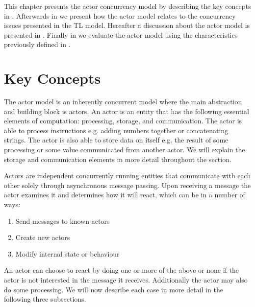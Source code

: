 \makeatletter {}\makeatother
{}
This chapter presents the actor concurrency model by describing the key concepts in . Afterwards in  we present how the actor model relates to the concurrency issues presented in the \ac{TL} model. Hereafter a discussion about the actor model is presented in . Finally in  we evaluate the actor model using the characteristics previously defined in .

\section{Key Concepts}\label{sec:actor_concepts}
The actor model is an inherently concurrent model where the main abstraction and building block is actors\cite[p. 2]{karmani2009actor}. An actor is an entity that has the following essential elements of computation\cite{actorLangNextVideo}: processing, storage, and communication. The actor is able to process instructions e.g. adding numbers together or concatenating strings. The actor is also able to store data on itself e.g. the result of some processing or some value communicated from another actor. We will explain the storage and communication elements in more detail throughout the section.

Actors are independent concurrently running entities that communicate with each other solely through asynchronous message passing\cite[p. 304]{tasharofi2013scala}. Upon receiving a message the actor examines it and determines how it will react, which can be in a number of ways\cite[p. 2]{hewitt2014actor}:
\begin{enumerate}
\item Send messages to known actors
\item Create new actors
\item Modify internal state or behaviour
\end{enumerate}
An actor can choose to react by doing one or more of the above or none if the actor is not interested in the message it receives. Additionally the actor may also do some processing. We will now describe each case in more detail in the following three subsections.

